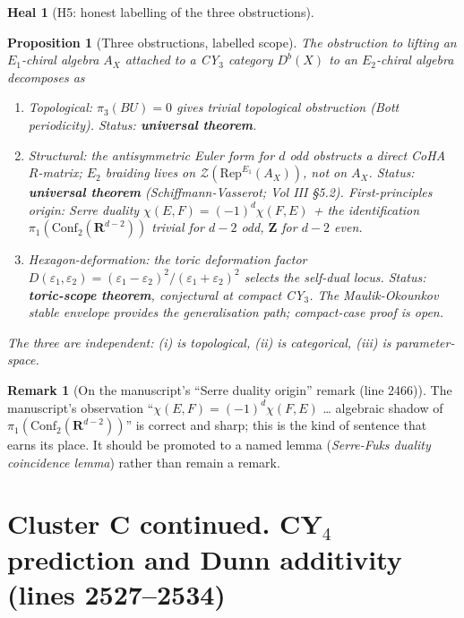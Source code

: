 \documentclass[11pt]{amsart}
\newtheorem{proposition}[theorem]{Proposition}
\theoremstyle{definition}
\newtheorem{heal}[attack]{Heal}
\newtheorem{remark}{Remark}
\providecommand{\Eone}{E_1}
\providecommand{\Etwo}{E_2}
\providecommand{\cZ}{\mathcal{Z}}
\providecommand{\bZ}{\mathbf{Z}}
\providecommand{\bR}{\mathbf{R}}
\providecommand{\Rep}{\mathrm{Rep}}
\begin{document}
\begin{heal}[H5: honest labelling of the three obstructions]\leavevmode

\begin{proposition}[Three obstructions, labelled scope]\label{prop:three-obstructions}
The obstruction to lifting an $\Eone$-chiral algebra $A_X$ attached to
a CY$_3$ category $D^b(X)$ to an $\Etwo$-chiral algebra decomposes as
\begin{enumerate}[label=\emph{(\roman*)}]
 \item Topological: $\pi_3(BU) = 0$ gives \emph{trivial} topological
   obstruction (Bott periodicity). Status: \textbf{universal theorem}.
 \item Structural: the antisymmetric Euler form for $d$ odd obstructs
   a direct CoHA $R$-matrix; $\Etwo$ braiding lives on
   $\cZ(\Rep^{\Eone}(A_X))$, not on $A_X$. Status: \textbf{universal theorem}
   (Schiffmann-Vasserot; Vol III \S5.2). First-principles origin:
   Serre duality $\chi(E,F) = (-1)^d\chi(F,E)$ + the identification
   $\pi_1(\mathrm{Conf}_2(\bR^{d-2}))$ trivial for $d-2$ odd, $\bZ$ for
   $d-2$ even.
 \item Hexagon-deformation: the toric deformation factor
   $D(\varepsilon_1,\varepsilon_2) = (\varepsilon_1 - \varepsilon_2)^2 /
   (\varepsilon_1 + \varepsilon_2)^2$ selects the self-dual locus. Status:
   \textbf{toric-scope theorem}, \emph{conjectural} at compact CY$_3$.
   The Maulik-Okounkov stable envelope provides the generalisation
   path; compact-case proof is open.
\end{enumerate}
The three are independent: (i) is topological, (ii) is categorical,
(iii) is parameter-space.
\end{proposition}

\begin{remark}[On the manuscript's ``Serre duality origin'' remark (line 2466)]
The manuscript's observation ``$\chi(E,F) = (-1)^d \chi(F,E)$ \ldots
algebraic shadow of $\pi_1(\mathrm{Conf}_2(\bR^{d-2}))$'' is correct
and sharp; this is the kind of sentence that earns its place. It
should be promoted to a named lemma (\emph{Serre-Fuks duality
coincidence lemma}) rather than remain a remark.
\end{remark}
\end{heal}

\section{Cluster C continued. CY$_4$ prediction and Dunn additivity (lines 2527--2534)}
\end{document}
